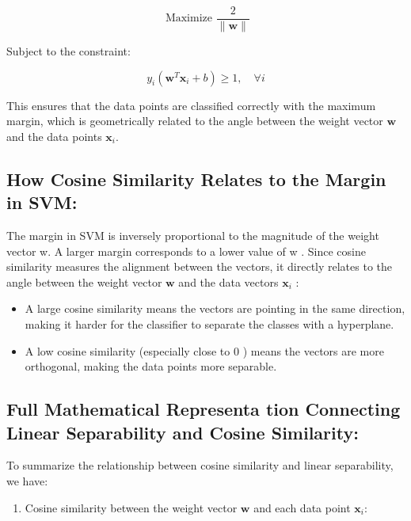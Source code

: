 \documentclass[
  12 pt,
  a4paper,
]{book}
\providecommand{\tightlist}{%
  \setlength{\itemsep}{0pt}\setlength{\parskip}{0pt}}
\numberwithin{equation}{section}
\theoremstyle{plain}      %
\theoremstyle{definition} %
\theoremstyle{remark}     %
\theoremstyle{note}         %
\begin{document}
\[
\text { Maximize } \frac{2}{\|\mathbf{w}\|}
\]

Subject to the constraint:

\[
y_i\left(\mathbf{w}^T \mathbf{x}_i+b\right) \geq 1, \quad \forall i
\]

This ensures that the data points are classified correctly with the
maximum margin, which is geometrically related to the angle between the
weight vector \(\mathbf{w}\) and the data points \(\mathbf{x}_i\).

\hypertarget{how-cosine-similarity-relates-to-the-margin-in-svm}{%
\subsection{How Cosine Similarity Relates to the Margin in
SVM:}\label{how-cosine-similarity-relates-to-the-margin-in-svm}}

The margin in SVM is inversely proportional to the magnitude of the
weight vector w. A larger margin corresponds to a lower value of
\textbar w \textbar\textbar. Since cosine similarity measures the
alignment between the vectors, it directly relates to the angle between
the weight vector \(\mathbf{w}\) and the data vectors \(\mathbf{x}_i\) :

\begin{itemize}
\tightlist
\item
  A large cosine similarity means the vectors are pointing in the same
  direction, making it harder for the classifier to separate the classes
  with a hyperplane.
\item
  A low cosine similarity (especially close to 0 ) means the vectors are
  more orthogonal, making the data points more separable.
\end{itemize}

\hypertarget{full-mathematical-representa-tion-connecting-linear-separability-and-cosine-similarity}{%
\subsection{Full Mathematical Representa tion Connecting Linear
Separability and Cosine
Similarity:}\label{full-mathematical-representa-tion-connecting-linear-separability-and-cosine-similarity}}

To summarize the relationship between cosine similarity and linear
separability, we have:

\begin{enumerate}
\def\labelenumi{\arabic{enumi}.}
\tightlist
\item
  Cosine similarity between the weight vector \(\mathbf{w}\) and each
  data point \(\mathbf{x}_i\):
\end{enumerate}
\end{document}
